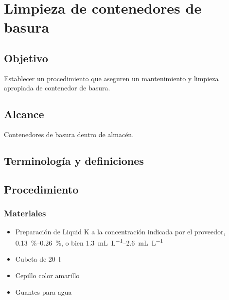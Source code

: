 \thispagestyle{formato-PI}
\renewcommand{\MenorVer}{0}
\renewcommand{\MayorVer}{2}
\renewcommand{\Codigo}{HYS-15-IT}
\renewcommand{\FechaPub}{2023--01}
\renewcommand{\Titulo}{Limpieza de contenedores de basura}

\section{\Titulo}

\subsection{Objetivo}
Establecer un procedimiento que aseguren un mantenimiento y limpieza apropiada de contenedor de basura.

\subsection{Alcance}
Contenedores de basura dentro de almacén.

\subsection{Terminología y definiciones}
\begin{description}
\end{description}

\subsection{Procedimiento}

\subsubsection{Materiales}
\begin{itemize}
	\item Preparación de Liquid K a la concentración indicada por el proveedor, \qtyrange{.13}{.26}{\percent}, o bien \qtyrange{1.3}{2.6}{\milli\liter\per\liter}
	\item Cubeta de \qty{20}{\litre}
	\item Cepillo color amarillo
	\item Guantes para agua
\end{itemize}

